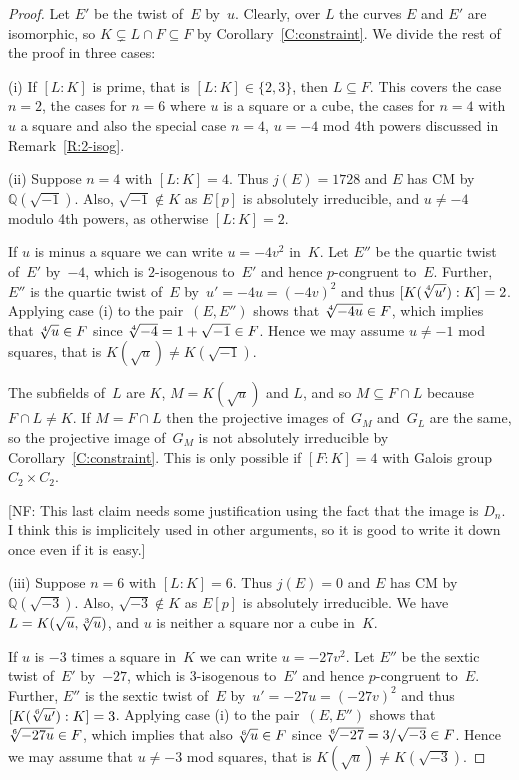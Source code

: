 \documentclass[12pt, reqno]{amsart}
\newcommand{\Q}{\mathbb{Q}}
\numberwithin{equation}{section}
\theoremstyle{definition}
\theoremstyle{remark}
\newcommand{\nf}[1]{{\color{blue} \textsf{[NF: #1]}}}
\begin{document}
\begin{proof} 
Let $E'$ be the twist of~$E$ by~$u$. Clearly, over $L$ the curves $E$ and $E'$ are isomorphic, so $K\subsetneq L\cap F\subseteq F$
by Corollary~\ref{C:constraint}.
We divide the rest of the proof in three cases:

(i) If $[L : K]$ is prime, that is $[L : K] \in \{2, 3\}$, then $L \subseteq F$. This covers the case $n=2$, the cases for $n=6$  where $u$ is a square or a cube, the cases for $n=4$ with $u$ a square
and also the special case $n=4$, $u=-4$ mod $4$th powers discussed in
Remark~\ref{R:2-isog}. 


(ii) Suppose $n=4$ with $[L : K]=4$. Thus $j(E) = 1728$ and $E$ has CM
by~$\Q(\sqrt{-1})$. Also, $\sqrt{-1} \not\in K$ as $E[p]$ is
absolutely irreducible, and $u \neq -4$ modulo 4th powers, as otherwise
$[L:K]=2$.

If $u$ is minus a square we can write $u=-4v^2$ in~$K$. Let $E''$ be the
quartic twist of~$E'$ by~$-4$, which is $2$-isogenous to~$E'$ and hence $p$-congruent
to~$E$. Further, $E''$ is the quartic twist of~$E$ by~$u' =  -4u = (-4v)^2$ and thus $[K(\root 4 \of {u'}) : K] = 2$.
Applying case (i)
to the pair~$(E,E'')$ shows that $\root4\of{-4u}\in F$, which implies
that $\root4\of{u}\in F$ since $\root4\of{-4}=1+\sqrt{-1}\in F$.
Hence we may assume $u \neq -1$ mod squares, that is $K(\sqrt{u}) \not= K(\sqrt{-1})$.

The subfields of~$L$ are $K$, $M=K(\sqrt{u})$ and $L$, and so $M
\subseteq F \cap L$ because $F \cap L \neq K$.  If $M=F\cap L$ then
the projective images of~$G_M$ and~$G_L$ are the same, so the
projective image of~$G_M$ is not absolutely irreducible by Corollary~\ref{C:constraint}.  This is only
possible if $[F:K]=4$ with Galois group~$C_2\times C_2$.

\nf{This last claim needs some justification using the fact that the image is $D_n$. I think this is implicitely used in other arguments, so it is good to write it down once even if it is easy.}

(iii) Suppose $n=6$ with $[L : K]=6$. Thus $j(E) = 0$ and $E$ has CM
by $\Q(\sqrt{-3})$. Also, $\sqrt{-3} \not\in K$ as $E[p]$ is
absolutely irreducible. We have $L = K(\sqrt{u},\root 3 \of u)$, and
$u$ is neither a square nor a cube in~$K$.

If $u$ is $-3$ times a square in~$K$ we can write $u=-27v^2$. Let $E''$
be the sextic twist of~$E'$ by~$-27$, which is $3$-isogenous to~$E'$ and hence
$p$-congruent to~$E$. 
Further, $E''$ is the sextic twist of~$E$ by~$u' =  -27u = (-27v)^2$ and thus $[K(\root 6 \of {u'}) : K] = 3$.
Applying case (i) to the pair~$(E,E'')$ shows that $\root6\of{-27u}\in
F$, which implies that also $\root6\of{u}\in F$ since
$\root6\of{-27}=3/\sqrt{-3}\in F$.  Hence we may assume that $u \neq -3$ mod squares, that is 
$K(\sqrt{u}) \not= K(\sqrt{-3})$.


\end{proof}
\end{document}
